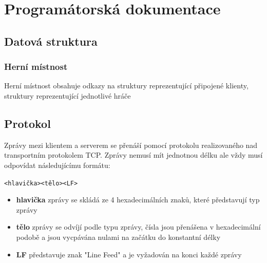 \documentclass[12pt,a4paper]{article}
\let\oldsection\section
\renewcommand\section{\clearpage\oldsection}
\begin{document}
\section{Programátorská dokumentace}
\subsection{Datová struktura}
\subsubsection*{Herní místnost}
Herní místnost obsahuje odkazy na struktury reprezentující připojené klienty, struktury reprezentující jednotlivé hráče

\subsection{Protokol}
Zprávy mezi klientem a serverem se přenáší pomocí protokolu realizovaného nad transportním protokolem TCP. Zprávy nemusí mít jednotnou délku ale vždy musí odpovídat následujícímu formátu:
\begin{center}
\texttt{<hlavička><tělo><LF>}
\end{center}
\begin{itemize}
\setlength\itemsep{0em}
\item \textbf{hlavička} zprávy se skládá ze 4 hexadecimálních znaků, které představují typ zprávy
\item \textbf{tělo} zprávy se odvíjí podle typu zprávy, čísla jsou přenášena v hexadecimální podobě a jsou vycpávána nulami na začátku do konstantní délky
\item \textbf{LF} představuje znak "Line Feed" a je vyžadován na konci každé zprávy
\end{itemize}
\end{document}
